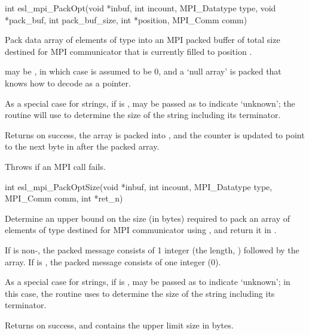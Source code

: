 \begin{sreapi}
\hypertarget{func:esl_mpi_PackOpt()}
{\item[int esl\_mpi\_PackOpt(void *inbuf, int incount, MPI\_Datatype type, void *pack\_buf, int pack\_buf\_size, int *position, MPI\_Comm comm)]}

Pack data array  of  elements of type  into
an MPI packed buffer  of total size  destined
for MPI communicator  that is currently filled to position .

 may be , in which case  is
assumed to be 0, and a `null array' is packed that
 knows how to decode as a 
pointer.

As a special case for strings, if  is ,
 may be passed as  to indicate `unknown';
the routine will use  to determine the
size of the string including its  terminator.

Returns  on success, the array is packed into , 
and the  counter is updated to point to the next byte
in  after the packed array.

Throws  if an MPI call fails.


\hypertarget{func:esl_mpi_PackOptSize()}
{\item[int esl\_mpi\_PackOptSize(void *inbuf, int incount, MPI\_Datatype type, MPI\_Comm comm, int *ret\_n)]}

Determine an upper bound on the size (in bytes) required
to pack an array  of  elements of type
 destined for MPI communicator  using
, and return it in .

If  is non-, the packed message consists
of 1 integer (the length, ) followed by the array.
If  is , the packed message consists of one
integer (0). 

As a special case for strings, if  is ,
 may be passed as  to indicate `unknown';
in this case, the routine uses  to determine the
size of the string including its  terminator.

Returns  on success, and  contains the upper limit size in
bytes.


\end{sreapi}
